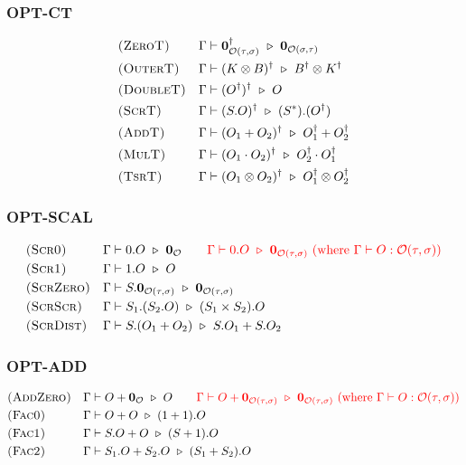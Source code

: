 \subsubsection*{\textsf{OPT-CT}}
\begin{align*}
  & \textsc{(ZeroT)} && \Gamma \vdash \mathbf{0}_{\mathcal{O}(\tau, \sigma)}^\dagger \ \triangleright\  \mathbf{0}_{\mathcal{O}(\sigma, \tau)} \\
  & \textsc{(OuterT)} && \Gamma \vdash (K \otimes B)^\dagger \ \triangleright\  B^\dagger \otimes K^\dagger \\
  & \textsc{(DoubleT)} && \Gamma \vdash (O^\dagger)^\dagger \ \triangleright\  O \\
  & \textsc{(ScrT)} && \Gamma \vdash (S.O)^\dagger \ \triangleright\  (S^*).(O^\dagger) \\
  & \textsc{(AddT)} && \Gamma \vdash (O_1 + O_2)^\dagger \ \triangleright\  O_1^\dagger + O_2^\dagger\\
  & \textsc{(MulT)} && \Gamma \vdash (O_1 \cdot O_2)^\dagger \ \triangleright\  O_2^\dagger \cdot O_1^\dagger \\
  & \textsc{(TsrT)} && \Gamma \vdash (O_1 \otimes O_2)^\dagger \ \triangleright\  O_1^\dagger \otimes O_2^\dagger
\end{align*}

\subsubsection*{\textsf{OPT-SCAL}}
\begin{align*}
  & \textsc{(Scr0)} && \Gamma \vdash 0.O \reduce \mathbf{0}_\mathcal{O}
  \qquad
  \textcolor{red}{\Gamma \vdash 0.O \reduce \zeroO{\tau, \sigma}\ \textrm{(where $\Gamma \vdash O : \mathcal{O}(\tau, \sigma)$)}} \\
  & \textsc{(Scr1)} && \Gamma \vdash 1.O \reduce O \\
  & \textsc{(ScrZero)} && \Gamma \vdash S.\zeroO{\tau, \sigma} \reduce \zeroO{\tau, \sigma} \\
  & \textsc{(ScrScr)} && \Gamma \vdash S_1.(S_2.O) \reduce (S_1 \times S_2).O \\
  & \textsc{(ScrDist)} && \Gamma \vdash S.(O_1 + O_2) \reduce S.O_1 + S.O_2
\end{align*}

\subsubsection*{\textsf{OPT-ADD}}
\begin{align*}
  & \textsc{(AddZero)} && \Gamma \vdash O + \mathbf{0}_\mathcal{O} \ \triangleright\  O 
  \qquad 
  \textcolor{red}{\Gamma \vdash O + \mathbf{0}_{\mathcal{O}(\tau, \sigma)} \ \triangleright\  \mathbf{0}_{\mathcal{O}(\tau, \sigma)}\ \textrm{(where $\Gamma \vdash O : \mathcal{O}(\tau, \sigma)$)}} \\
  & \textsc{(Fac0)} && \Gamma \vdash O + O \ \triangleright\  (1 + 1).O \\
  & \textsc{(Fac1)} && \Gamma \vdash S.O + O \ \triangleright\  (S + 1).O \\
  & \textsc{(Fac2)} && \Gamma \vdash S_1.O + S_2.O \ \triangleright\  (S_1 + S_2).O
\end{align*}

